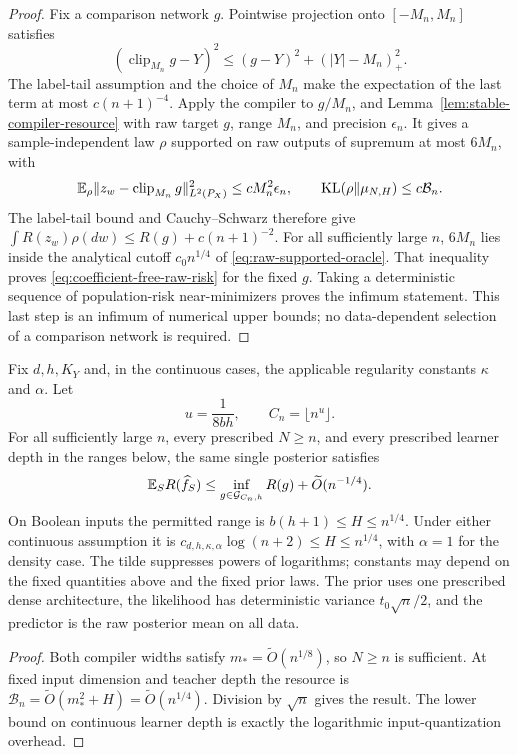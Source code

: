 \begin{proof}
Fix a comparison network $g$.  Pointwise projection onto $[-M_n,M_n]$
satisfies
\[
 (\operatorname{clip}_{M_n}g-Y)^2
 \le(g-Y)^2+(|Y|-M_n)_+^2.
\]
The label-tail assumption and the choice of $M_n$ make the expectation
of the last term at most $c(n+1)^{-4}$.  Apply the compiler to $g/M_n$, and Lemma~\ref{lem:stable-compiler-resource}
with raw target $g$, range $M_n$, and precision $\epsilon_n$.
It gives a sample-independent law $\rho$ supported on raw outputs of
supremum at most $6M_n$, with
\[
 \mathbb E_\rho\|z_w-\operatorname{clip}_{M_n}g\|_{L^2(P_X)}^2
                       \le cM_n^2\epsilon_n,
 \qquad \operatorname{KL}(\rho\|\mu_{N,H})\le c\mathcal B_n.
\]
The label-tail bound and Cauchy--Schwarz therefore give
$\int R(z_w)\rho(dw)\le R(g)+c(n+1)^{-2}$.
For all sufficiently large $n$, $6M_n$ lies inside the analytical cutoff
$c_0n^{1/4}$ of \eqref{eq:raw-supported-oracle}.  That inequality proves
\eqref{eq:coefficient-free-raw-risk} for the fixed $g$.
Taking a deterministic sequence of population-risk near-minimizers proves
the infimum statement.  This last step is an
infimum of numerical upper bounds; no data-dependent selection of a
comparison network is required.
\end{proof}

\begin{corollary}\label{cor:raw-growing-width}
Fix $d,h,K_Y$ and, in the continuous cases, the applicable regularity
constants $\kappa$ and $\alpha$.  Let
\[
 u=\frac1{8bh},\qquad C_n=\lfloor n^u\rfloor.
\]
For all sufficiently large $n$, every prescribed $N\ge n$, and every
prescribed learner depth in the ranges below, the same single posterior
satisfies
\begin{equation}\label{eq:growing-class-raw}
 \mathbb E_S R(\widehat f_S)
 \le\inf_{g\in\mathcal G_{C_n,h}}R(g)
                     +\widetilde O(n^{-1/4}).
\end{equation}
On Boolean inputs the permitted range is
$b(h+1)\le H\le n^{1/4}$.  Under either continuous assumption it is
$c_{d,h,\kappa,\alpha}\log(n+2)\le H\le n^{1/4}$, with $\alpha=1$
for the density case.
The tilde suppresses powers of logarithms; constants may depend on the
fixed quantities above and the fixed prior laws.  The prior uses one
prescribed dense architecture, the likelihood has deterministic variance
$t_0\sqrt n/2$, and the predictor is the raw posterior mean on all data.
\end{corollary}
\begin{proof}
Both compiler widths satisfy $m_*=\widetilde O(n^{1/8})$, so $N\ge n$
is sufficient.  At fixed input dimension and teacher depth the resource is
$\mathcal B_n=\widetilde O(m_*^2+H)=\widetilde O(n^{1/4})$.
Division by $\sqrt n$ gives the result.  The lower bound on continuous
learner depth is exactly the logarithmic input-quantization overhead.
\end{proof}

